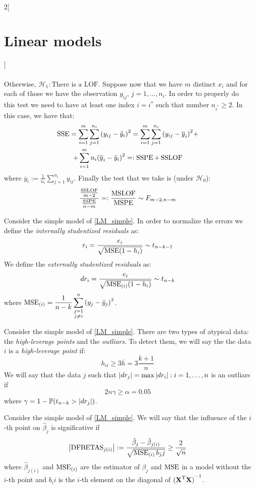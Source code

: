 \documentclass[../../../main_math.tex]{subfiles}
\begin{document}
\begin{multicols}{2}[\section{Linear models}]
\begin{proposition}
\begin{align*}
    \end{align*}
    Otherwise, $\mathcal{H}_1: \text{There is a LOF}$.
    Suppose now that we have $m$ distinct $x_i$ and for each of those we have the observation $y_{ij}$, $j=1,\ldots,n_i$. In order to properly do this test we need to have at least one index $i=i^*$ such that number $n_{i^*}\geq 2$. In this case, we have that:
    \begin{multline*}
      \operatorname{SSE}=\sum_{i=1}^m\sum_{j=1}^{n_i}{(y_{ij}-\hat{y}_i)}^2 =\sum_{i=1}^m\sum_{j=1}^{n_i}{(y_{ij}-\overline{y}_i)}^2+\\+\sum_{i=1}^mn_i{(\overline{y}_i-\hat{y}_i)}^2=:\operatorname{SSPE}+\operatorname{SSLOF}
    \end{multline*}
    where $\overline{y}_i:=\frac{1}{n_i}\sum_{j=1}^{n_i}y_{ij}$. Finally the test that we take is (under $\mathcal{H}_0$):
    $$\frac{\frac{\operatorname{SSLOF}}{m-2}}{\frac{\operatorname{SSPE}}{n-m}}=:\frac{\operatorname{MSLOF}}{\operatorname{MSPE}}\sim F_{m-2,n-m}$$
  \end{proposition}
  \begin{definition}
    Consider the simple model of \cref{LM_simple}. In order to normalize the errors we define the \emph{internally studentized residuals} as: $$r_i=\frac{e_i}{\sqrt{\operatorname{MSE}(1-h_i)}}\sim t_{n-k-1}$$
    We define the \emph{externally studentized residuals} as: $$dr_i=\frac{e_i}{\sqrt{\operatorname{MSE}_{(i)}(1-h_i)}}\sim t_{n-k}$$ where $\displaystyle\operatorname{MSE}_{(i)}=\frac{1}{n-k}\sum_{\substack{j=1\\j\ne i}}^n{(y_j-\hat{y}_j)}^2$.
  \end{definition}
  \begin{definition}
    Consider the simple model of \cref{LM_simple}. There are two types of atypical data: the \emph{high-leverage points} and the \emph{outliars}.
    To detect them, we will say the the data $i$ is a \emph{high-leverage point} if: $$h_{ii}\geq 3\overline{h}=3\frac{k+1}{n}$$
    We will say that the data $j$ such that $\abs{dr_j}=\max{\abs{dr_i}:i=1,\ldots,n}$ is an outliars if $$2n\gamma\geq \alpha=0.05$$ where $\gamma=1-\mathbb{P}(t_{n-k}>\abs{dr_j})$.
  \end{definition}
  \begin{definition}
    Consider the simple model of \cref{LM_simple}. We will say that the influence of the $i$-th point on $\hat\beta_j$ is significative if $$\abs{\mathrm{DFBETAS}_{j(i)}}:=\frac{\hat\beta_j-\hat\beta_{j(i)}}{\sqrt{\operatorname{MSE}_{(i)}b_jj}}\geq \frac{2}{\sqrt{n}}$$ where $\hat\beta_{j(i)}$ and $\operatorname{MSE}_{(i)}$ are the estimator of $\hat\beta_j$ and $\operatorname{MSE}$ in a model without the $i$-th point and $b_ii$ is the $i$-th element on the diagonal of ${({\boldsymbol{\mathrm{X}}}^{\mathrm{T}}\boldsymbol{\mathrm{X}})}^{-1}$.

\end{definition}
\end{multicols}
\end{document}
